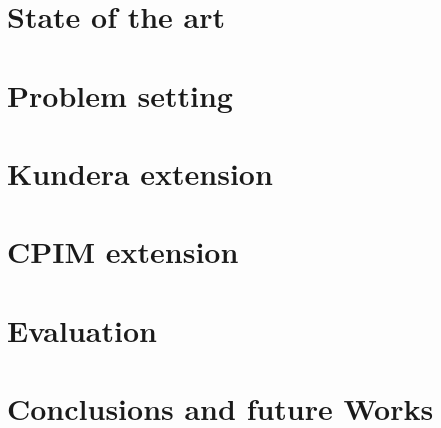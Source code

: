 \documentclass[12pt,a4paper,twoside,openright]{report}
\begin{document}
\chapter{State of the art}
\label{chap:sota}


\chapter{Problem setting}
\label{chap:ps}


\chapter{Kundera extension}
\label{chap:kundera}


\chapter{CPIM extension}
\label{chap:cpim}


\chapter{Evaluation}
\label{chap:eval}


\chapter{Conclusions and future Works}
\label{chap:conclusions}


\end{document}
